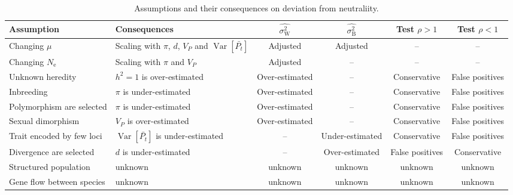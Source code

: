\documentclass{article}
\DeclareMathOperator{\Var}{\text{Var}}
\newcommand{\Ne}{N_{\text{e}}}
\newcommand{\Time}{t}
\newcommand{\Trait}{P}
\newcommand{\Heredity}{h^2}
\newcommand{\MeanTrait}{\bar{\Trait_{\Time}}}
\newcommand{\VarPhy}{\Var \left[\MeanTrait\right]}
\newcommand{\MutationRate}{\mu}
\newcommand{\VarPhenotype}{V_{\Trait}}
\newcommand{\RatePhy}{\sigma^2_{\mathrm{B}}}
\newcommand{\RatePop}{\sigma^2_{\mathrm{W}}}
\newcommand{\EstRatePhy}{\widehat{\RatePhy}}
\newcommand{\EstRatePop}{\widehat{\RatePop}}
\newcommand{\NI}{\rho}
\begin{document}
\begin{table*}[t!]
    \centering
    \begin{adjustbox}{width = 1.0\textwidth}
    \begin{tabular}{||l|l||c|c||c|c||}
            \hline
            Assumption & Consequences & $\EstRatePop$ & $\EstRatePhy$ & Test $\NI > 1$  & Test $\NI < 1$ \\ \hline \hline
            Changing $\MutationRate$ & Scaling with $\pi$, $d$, $\VarPhenotype$ and $\VarPhy$ & Adjusted & Adjusted & -- & --  \\ \hline
            Changing $\Ne$ & Scaling with $\pi$ and $\VarPhenotype$ & Adjusted & -- & -- & --  \\ \hline
            Unknown heredity & $\Heredity = 1$ is over-estimated  & Over-estimated & -- & Conservative & False positives  \\ \hline
            Inbreeding & $\pi$ is under-estimated  & Over-estimated & -- & Conservative & False positives  \\ \hline
            Polymorphism are selected & $\pi$ is under-estimated  & Over-estimated & -- & Conservative & False positives  \\ \hline
            Sexual dimorphism & $\VarPhenotype$ is over-estimated  & Over-estimated & -- & Conservative & False positives  \\ \hline
            Trait encoded by few loci & $\VarPhy$ is under-estimated  & -- & Under-estimated & Conservative & False positives  \\ \hline
            Divergence are selected & $d$ is under-estimated & -- & Over-estimated & False positives & Conservative  \\ \hline
            Structured population & unknown & unknown & unknown & unknown & unknown \\ \hline
            Gene flow between species & unknown & unknown & unknown & unknown & unknown \\ \hline
    \end{tabular}
    \end{adjustbox}
    \caption{Assumptions and their consequences on deviation from neutraliity.}
    \label{table:assumptions}
\end{table*}
\end{document}
